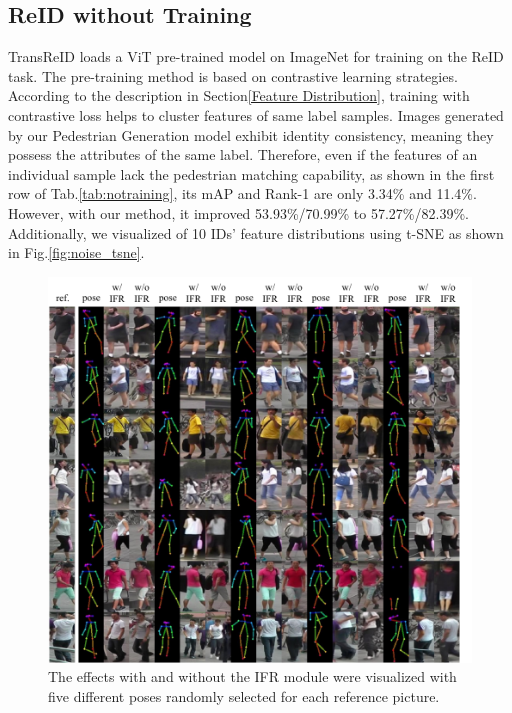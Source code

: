 \subsection{ReID without Training}
TransReID loads a ViT pre-trained model on ImageNet for training on the ReID task. The pre-training method is based on contrastive learning strategies. According to the description in Section\ref{Feature Distribution}, training with contrastive loss helps to cluster features of same label samples. Images generated by our Pedestrian Generation model exhibit identity consistency, meaning they possess the attributes of the same label. Therefore, even if the features of an individual sample lack the pedestrian matching capability, as shown in the first row of Tab.\ref{tab:notraining}, its mAP and Rank-1 are only 3.34\% and 11.4\%. However, with our method, it improved 53.93\%/70.99\% to 57.27\%/82.39\%. Additionally, we visualized of 10 IDs' feature distributions using t-SNE as shown in Fig.\ref{fig:noise_tsne}.


\begin{figure}
\centering
\includegraphics[width=0.95\linewidth]{figs/pdf/IFR.pdf}
\caption{The effects with and without the IFR module were visualized with five different poses randomly selected for each reference picture.}
\label{fig:IFR}
\end{figure}


